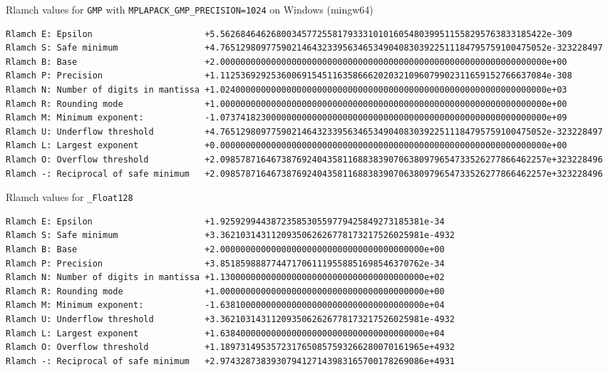 \documentclass[12pt]{article}
\begin{document}
\begin{table}
\caption{Rlamch values for {\tt GMP} with {\tt MPLAPACK\_GMP\_PRECISION=1024} on Windows (mingw64)} \label{rlamchgmp1024}
\begin{center}
\scriptsize
{
\begin{verbatim}
Rlamch E: Epsilon                      +5.5626846462680034577255817933310101605480399511558295763833185422e-309
Rlamch S: Safe minimum                 +4.7651298097759021464323395634653490408303922511184795759100475052e-323228497
Rlamch B: Base                         +2.0000000000000000000000000000000000000000000000000000000000000000e+00
Rlamch P: Precision                    +1.1125369292536006915451163586662020321096079902311659152766637084e-308
Rlamch N: Number of digits in mantissa +1.0240000000000000000000000000000000000000000000000000000000000000e+03
Rlamch R: Rounding mode                +1.0000000000000000000000000000000000000000000000000000000000000000e+00
Rlamch M: Minimum exponent:            -1.0737418230000000000000000000000000000000000000000000000000000000e+09
Rlamch U: Underflow threshold          +4.7651298097759021464323395634653490408303922511184795759100475052e-323228497
Rlamch L: Largest exponent             +0.0000000000000000000000000000000000000000000000000000000000000000e+00
Rlamch O: Overflow threshold           +2.0985787164673876924043581168838390706380979654733526277866462257e+323228496
Rlamch -: Reciprocal of safe minimum   +2.0985787164673876924043581168838390706380979654733526277866462257e+323228496

\end{verbatim}
}
\end{center}
\end{table}


\begin{table}
\caption{Rlamch values for {\tt \_Float128}}\label{rlamch_float128}
\begin{center}
\begin{verbatim}
Rlamch E: Epsilon                      +1.9259299443872358530559779425849273185381e-34
Rlamch S: Safe minimum                 +3.3621031431120935062626778173217526025981e-4932
Rlamch B: Base                         +2.0000000000000000000000000000000000000000e+00
Rlamch P: Precision                    +3.8518598887744717061119558851698546370762e-34
Rlamch N: Number of digits in mantissa +1.1300000000000000000000000000000000000000e+02
Rlamch R: Rounding mode                +1.0000000000000000000000000000000000000000e+00
Rlamch M: Minimum exponent:            -1.6381000000000000000000000000000000000000e+04
Rlamch U: Underflow threshold          +3.3621031431120935062626778173217526025981e-4932
Rlamch L: Largest exponent             +1.6384000000000000000000000000000000000000e+04
Rlamch O: Overflow threshold           +1.1897314953572317650857593266280070161965e+4932
Rlamch -: Reciprocal of safe minimum   +2.9743287383930794127143983165700178269086e+4931

\end{verbatim}
\end{center}
\end{table}
\end{document}
